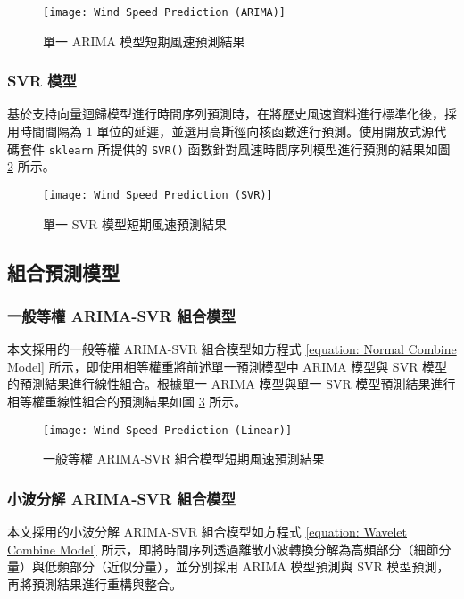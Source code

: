 \begin{figure}[htbp]
  \centering
  \texttt{[image: Wind Speed Prediction (ARIMA)]}
  \caption{單一 ARIMA 模型短期風速預測結果}
  \label{figure: Wind Speed Prediction ARIMA}
\end{figure}

\subsubsection{SVR 模型}

基於支持向量迴歸模型進行時間序列預測時，在將歷史風速資料進行標準化後，採用時間間隔為 $1$ 單位的延遲，並選用高斯徑向核函數進行預測。使用開放式源代碼套件 \texttt{sklearn} 所提供的 \texttt{SVR()} 函數針對風速時間序列模型進行預測的結果如圖 \ref{figure: Wind Speed Prediction SVR} 所示。

\begin{figure}[htbp]
  \centering
  \texttt{[image: Wind Speed Prediction (SVR)]}
  \caption{單一 SVR 模型短期風速預測結果}
  \label{figure: Wind Speed Prediction SVR}
\end{figure}

\subsection{組合預測模型}

\subsubsection{一般等權 ARIMA-SVR 組合模型}

本文採用的一般等權 ARIMA-SVR 組合模型如方程式 \eqref{equation: Normal Combine Model} 所示，即使用相等權重將前述單一預測模型中 ARIMA 模型與 SVR 模型的預測結果進行線性組合。根據單一 ARIMA 模型與單一 SVR 模型預測結果進行相等權重線性組合的預測結果如圖 \ref{figure: Wind Speed Prediction Linear} 所示。

\begin{figure}[htbp]
  \centering
  \texttt{[image: Wind Speed Prediction (Linear)]}
  \caption{一般等權 ARIMA-SVR 組合模型短期風速預測結果}
  \label{figure: Wind Speed Prediction Linear}
\end{figure}

\subsubsection{小波分解 ARIMA-SVR 組合模型}

本文採用的小波分解 ARIMA-SVR 組合模型如方程式 \eqref{equation: Wavelet Combine Model} 所示，即將時間序列透過離散小波轉換分解為高頻部分（細節分量）與低頻部分（近似分量），並分別採用 ARIMA 模型預測與 SVR 模型預測，再將預測結果進行重構與整合。


